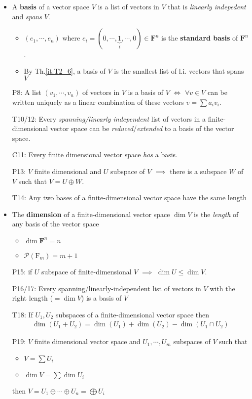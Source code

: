 \documentclass[11pt,notitlepage,oneside]{article}
\DeclareMathOperator{\dimension}{dim}
\newcommand{\tref}[1]{Th.\ref{#1}}
\begin{document}
\begin{itemize}
\item A \textbf{basis} of a vector space $V$ is a list of vectors in $V$ that is \emph{linearly indepedent} and \emph{spans} $V$.
\begin{itemize}
\item $(e_1, \cdots, e_n)$ where $e_i=(0,\cdots, \underbrace{1}_{i},\cdots,0)\in\mathbf{F}^n$ is the \textbf{standard basis} of $\mathbf{F}^n$. 
\item By \tref{it:T2_6}, a basis of $V$ is the smallest list of l.i. vectors that spans $V$
\end{itemize}
\item[P8:] A list $(v_1,\cdots,v_n)$ of vectors in $V$ is a basis of $V$ $\iff$ $\forall v\in V$ can be written uniquely as a linear combination of these vectors $v=\sum a_i v_i$.
\item[T10/12:] Every \emph{spanning/linearly independent}  list of vectors in a finite-dimensional vector space can be \emph{reduced}/\emph{extended} to a basis of the vector space.
\item[C11:] Every finite dimensional vector space \emph{has} a basis.
\item[P13:] $V$ finite dimensional and $U$ subspace of $V$ $\implies$ there is a subspace $W$ of $V$ such that $V=U\oplus W$.
%
\item[T14:] Any two bases of a finite-dimensional vector space have the same length
\item The \textbf{dimension} of a finite-dimensional vector space $\dimension{V}$ is the \emph{length} of any basis of the vector space
\begin{itemize}
  \item $\dimension{\mathbf{F}^n} = n$
  \item $\mathcal{P}(\mathrm{F}_m) = m+1$
\end{itemize}
\item[P15:] if $U$  subspace of finite-dimensional $V$ $\implies$ $\dimension{U}\leq\dimension{V}$.
%
\item[P16/17:]Every spanning/linearly-independent list of vectors in $V$ with the right length ($=\dimension{V}$) is a basis of $V$ 
%
\item[T18:] If $U_1,U_2$ subspaces of a finite-dimensional vector space then 
\begin{align*}
\dimension(U_1+U_2)=\dimension(U_1)+\dimension(U_2) - \dimension(U_1\cap U_2)
\end{align*}
\item[P19:\label{it:T2_19}] $V$ finite dimensional vector space and $U_1,\cdots,U_m$ subspaces of $V$ such that 
\begin{itemize}
  \item $V=\sum U_i$
  \item $\dimension{V}=\sum\dimension{U_i}$
\end{itemize}
 then $V=U_1 \oplus \cdots \oplus U_n = \bigoplus U_i$
\end{itemize}
\end{document}
